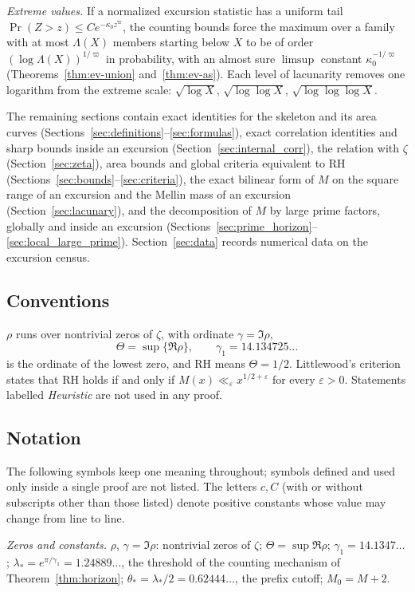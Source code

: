 \documentclass[11pt]{amsart}
\numberwithin{equation}{section}
\theoremstyle{plain}
\theoremstyle{definition}
\theoremstyle{remark}
\newcommand{\eps}{\varepsilon}
\begin{document}
\smallskip\noindent\emph{Extreme values.} If a normalized excursion statistic
has a uniform tail $\Pr(Z>z)\le Ce^{-\kappa_0z^\varpi}$, the counting bounds force the
maximum over a family with at most $\Lambda(X)$ members starting below $X$ to be
of order $(\log \Lambda(X))^{1/\varpi}$ in probability, with an almost sure $\limsup$ constant
$\kappa_0^{-1/\varpi}$ (Theorems~\ref{thm:ev-union} and~\ref{thm:ev-as}). Each level of
lacunarity removes one logarithm from the extreme scale:
$\sqrt{\log X}$, $\sqrt{\log\log X}$, $\sqrt{\log\log\log X}$.

\smallskip
The remaining sections contain exact identities for the skeleton and its area
curves (Sections~\ref{sec:definitions}--\ref{sec:formulas}), exact
correlation identities and sharp bounds inside an excursion
(Section~\ref{sec:internal_corr}), the relation with $\zeta$
(Section~\ref{sec:zeta}), area bounds and global criteria equivalent to RH
(Sections~\ref{sec:bounds}--\ref{sec:criteria}), the exact bilinear form of
$M$ on the square range of an excursion and the Mellin mass of an excursion
(Section~\ref{sec:lacunary}), and the decomposition of $M$ by large prime
factors, globally and inside an excursion
(Sections~\ref{sec:prime_horizon}--\ref{sec:local_large_prime}).
Section~\ref{sec:data} records numerical data on the excursion census.

\subsection*{Conventions}
$\rho$ runs over nontrivial zeros of $\zeta$, with ordinate $\gamma=\Im\rho$,
\[
\Theta=\sup\{\Re\rho\},\qquad \gamma_1=14.134725\ldots
\]
is the ordinate of the lowest zero, and RH means $\Theta=1/2$. Littlewood's
criterion \cite[\S14.25]{Titchmarsh1986} states that RH holds if and only if
$M(x)\ll_\eps x^{1/2+\eps}$ for every $\eps>0$. Statements labelled
\emph{Heuristic} are not used in any proof.

\subsection*{Notation}
\label{subsec:notation}
The following symbols keep one meaning throughout; symbols defined and used
only inside a single proof are not listed. The letters $c,C$ (with or without
subscripts other than those listed) denote positive constants whose value may
change from line to line.

\smallskip
\noindent\emph{Zeros and constants.}
$\rho$, $\gamma=\Im\rho$: nontrivial zeros of $\zeta$;
$\Theta=\sup\Re\rho$;
$\gamma_1=14.1347\ldots$;
$\lambda_*=e^{\pi/\gamma_1}=1.24889\ldots$, the threshold of the counting
mechanism of Theorem~\ref{thm:horizon};
$\theta_*=\lambda_*/2=0.62444\ldots$, the prefix cutoff;
$M_0=M+2$.
\end{document}

